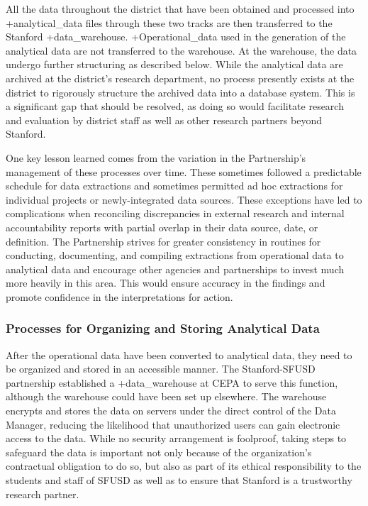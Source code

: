 \documentclass[
]{WileySix}
\begin{document}
All the data throughout the district that have been obtained and processed into +analytical\_data\textbar{} files through these two tracks are then transferred to the Stanford +data\_warehouse\textbar. +Operational\_data\textbar{} used in the generation of the analytical data are not transferred to the warehouse. At the warehouse, the data undergo further structuring as described below. While the analytical data are archived at the district's research department, no process presently exists at the district to rigorously structure the archived data into a database system. This is a significant gap that should be resolved, as doing so would facilitate research and evaluation by district staff as well as other research partners beyond Stanford.

One key lesson learned comes from the variation in the Partnership's management of these processes over time. These sometimes followed a predictable schedule for data extractions and sometimes permitted ad hoc extractions for individual projects or newly-integrated data sources. These exceptions have led to complications when reconciling discrepancies in external research and internal accountability reports with partial overlap in their data source, date, or definition. The Partnership strives for greater consistency in routines for conducting, documenting, and compiling extractions from operational data to analytical data and encourage other agencies and partnerships to invest much more heavily in this area. This would ensure accuracy in the findings and promote confidence in the interpretations for action.

\hypertarget{processes-for-organizing-and-storing-analytical-data}{%
\subsubsection{Processes for Organizing and Storing Analytical Data}\label{processes-for-organizing-and-storing-analytical-data}}

After the operational data have been converted to analytical data, they need to be organized and stored in an accessible manner. The Stanford-SFUSD partnership established a +data\_warehouse\textbar{} at CEPA to serve this function, although the warehouse could have been set up elsewhere. The warehouse encrypts and stores the data on servers under the direct control of the Data Manager, reducing the likelihood that unauthorized users can gain electronic access to the data. While no security arrangement is foolproof, taking steps to safeguard the data is important not only because of the organization's contractual obligation to do so, but also as part of its ethical responsibility to the students and staff of SFUSD as well as to ensure that Stanford is a trustworthy research partner.
\end{document}

